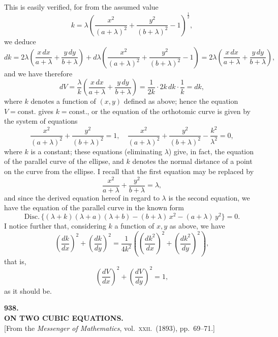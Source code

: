 \documentclass[11pt]{article}
\providecommand{\Disc}{\mathrm{Disc}}
\begin{document}
This is easily verified, for from the assumed value
\[
k = \lambda\!\left(\frac{x^2}{(a + \lambda)^2} + \frac{y^2}{(b + \lambda)^2} - 1\right)^{\!\!\tfrac{1}{2}},
\]
we deduce
\[
dk = 2\lambda\!\left(\frac{x\, dx}{a + \lambda} + \frac{y\, dy}{b + \lambda}\right) + d\lambda\!\left(\frac{x^2}{(a + \lambda)^2} + \frac{y^2}{(b + \lambda)^2} - 1\right) = 2\lambda\!\left(\frac{x\, dx}{a + \lambda} + \frac{y\, dy}{b + \lambda}\right),
\]
and we have therefore
\[
dV = \frac{\lambda}{k}\!\left(\frac{x\, dx}{a + \lambda} + \frac{y\, dy}{b + \lambda}\right) = \frac{1}{2k}\cdot 2 k\, dk\cdot\frac{1}{k} = dk,
\]
where $k$ denotes a function of $(x, y)$ defined as above; hence the equation $V = \mathrm{const.}$ gives $k = \mathrm{const.}$, or the equation of the orthotomic curve is given by the system of equations
\[
\frac{x^2}{(a + \lambda)^2} + \frac{y^2}{(b + \lambda)^2} = 1,\quad \frac{x^2}{(a + \lambda)^2} + \frac{y^2}{(b + \lambda)^2} - \frac{k^2}{\lambda^2} = 0,
\]
where $k$ is a constant; these equations (eliminating $\lambda$) give, in fact, the equation of the parallel curve of the ellipse, and $k$ denotes the normal distance of a point on the curve from the ellipse.  I recall that the first equation may be replaced by
\[
\frac{x^2}{a + \lambda} + \frac{y^2}{b + \lambda} = \lambda,
\]
and since the derived equation hereof in regard to $\lambda$ is the second equation, we have the equation of the parallel curve in the known form
\[
\Disc.\,\{(\lambda + k)(\lambda + a)(\lambda + b) - (b + \lambda)\, x^2 - (a + \lambda)\, y^2\} = 0.
\]
I notice further that, considering $k$ a function of $x, y$ as above, we have
\[
\left(\frac{dk}{dx}\right)^{\!2} + \left(\frac{dk}{dy}\right)^{\!2} = \frac{1}{4 k^2}\!\left(\!\left(\frac{dk^2}{dx}\right)^{\!2} + \left(\frac{dk^2}{dy}\right)^{\!2}\right),
\]
that is,
\[
\left(\frac{dV}{dx}\right)^{\!2} + \left(\frac{dV}{dy}\right)^{\!2} = 1,
\]
as it should be.

\clearpage
\begin{center}
{\large\bfseries 938.}\\[0.5em]
{\large\bfseries ON TWO CUBIC EQUATIONS.}\\[0.5em]
{\small [From the \textit{Messenger of Mathematics}, vol.\ \textsc{xxii}.\ (1893), pp.\ 69--71.]}
\end{center}
\vspace{0.5em}
\end{document}

